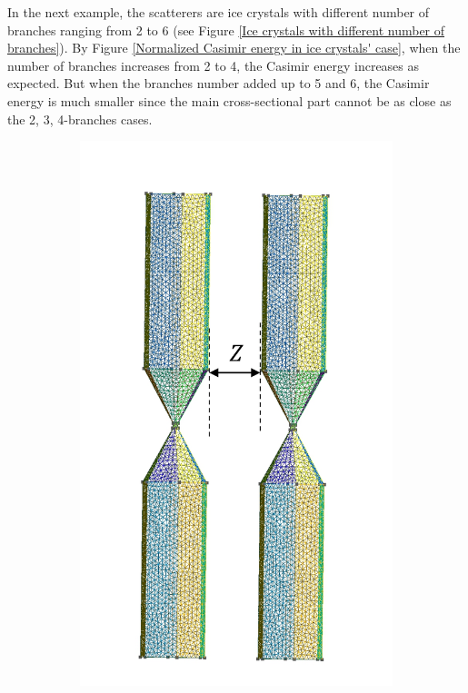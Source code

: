 In the next example, the scatterers are ice crystals with different number of branches ranging from 2 to 6 (see Figure \ref{Ice crystals with different number of branches}).
By Figure \ref{Normalized Casimir energy in ice crystals' case}, when the number of branches increases from 2 to 4, the Casimir energy increases as expected. But 
when the branches number added up to 5 and 6, the Casimir energy is much smaller since the main cross-sectional part cannot be as close as the 
2, 3, 4-branches cases. 

\begin{figure}[H]
    \begin{subfigure}{0.3\linewidth}
        \centering
        \includegraphics[scale = 0.4]{figures/2branches}

\end{subfigure}
\end{figure}

